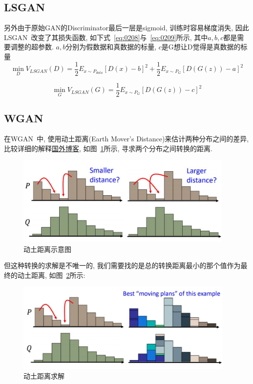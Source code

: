 \subsection{LSGAN}
另外由于原始GAN的Discriminator最后一层是sigmoid, 训练时容易梯度消失, 因此LSGAN~\cite{LSGAN}改变了其损失函数, 如下式~\ref{eq:0208}与~\ref{eq:0209}所示, 其中$a, b, c$都是需要调整的超参数. $a, b$分别为假数据和真数据的标量, $c$是G想让D觉得是真数据的标量
\begin{equation}
    \min \limits_{D}V_{LSGAN}(D)=\frac{1}{2}E_{x\sim P_{data}}[D(x)-b]^{2} + \frac{1}{2}E_{x\sim P_{G}}[D(G(z))-a]^{2}
    \label{eq:0208}
\end{equation}

\begin{equation}
    \min \limits_{G}V_{LSGAN}(G)= \frac{1}{2}E_{x\sim P_{G}}[D(G(z))-c]^{2}
    \label{eq:0209}
\end{equation}

\subsection{WGAN}
在WGAN~\cite{WGAN}中, 使用动土距离(Earth Mover's Distance)来估计两种分布之间的差异, 比较详细的解释\href{https://vincentherrmann.github.io/blog/wasserstein/}{国外博客}, 如图~\ref{fig:0201}所示, 寻求两个分布之间转换的距离.
\begin{figure}[!htbp]
    \centering
    \includegraphics[height=12em]{pic/pic0201.jpg}
    \caption{动土距离示意图}
    \label{fig:0201}
\end{figure}

但这种转换的求解是不唯一的, 我们需要找的是总的转换距离最小的那个值作为最终的动土距离, 如图~\ref{fig:0202}所示:
\begin{figure}[!htbp]
    \centering
    \includegraphics[height=12em]{pic/pic0202.jpg}
    \caption{动土距离求解}
    \label{fig:0202}
\end{figure}

